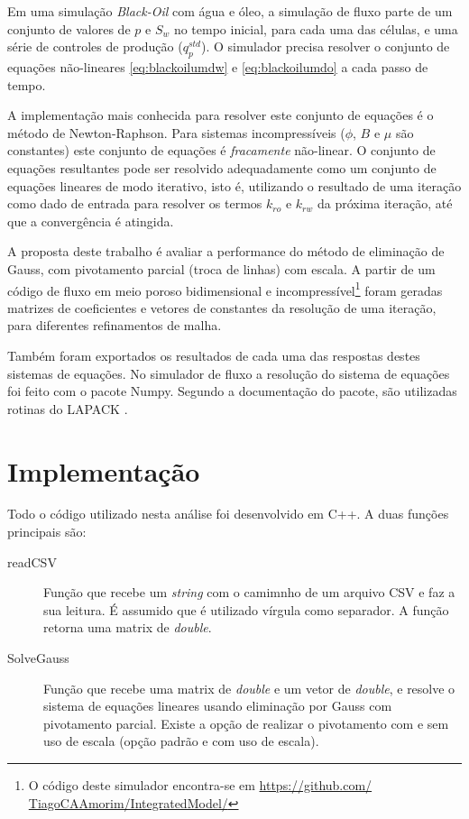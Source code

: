 \documentclass[final,5p]{elsarticle}
\numberwithin{equation}{section}
\begin{document}
            Em uma simulação \emph{Black-Oil} com água e óleo, a simulação de fluxo parte de um conjunto de valores de $p$ e $S_w$ no tempo inicial, para cada uma das células, e uma série de controles de produção ($q^{std}_p$). O simulador precisa resolver o conjunto de equações não-lineares \ref{eq:blackoilumdw} e \ref{eq:blackoilumdo} a cada passo de tempo.

            A implementação mais conhecida para resolver este conjunto de equações é o método de Newton-Raphson. Para sistemas incompressíveis ($\phi$, $B$ e $\mu$ são constantes) este conjunto de equações é \emph{fracamente} não-linear. O conjunto de equações resultantes pode ser resolvido adequadamente como um conjunto de equações lineares de modo iterativo, isto é, utilizando o resultado de uma iteração como dado de entrada para resolver os termos $k_{ro}$ e $k_{rw}$ da próxima iteração, até que a convergência é atingida.

            A proposta deste trabalho é avaliar a performance do método de eliminação de Gauss, com pivotamento parcial (troca de linhas) com escala. A partir de um código de fluxo em meio poroso bidimensional e incompressível\footnote{O código deste simulador encontra-se em \href{https://github.com/TiagoCAAmorim/IntegratedModel/tree/test_matrix}{https://github.com/ TiagoCAAmorim/IntegratedModel/}} foram geradas matrizes de coeficientes e vetores de constantes da resolução de uma iteração, para diferentes refinamentos de malha.

            Também foram exportados os resultados de cada uma das respostas destes sistemas de equações. No simulador de fluxo a resolução do sistema de equações foi feito com o pacote Numpy. Segundo a documentação do pacote, são utilizadas rotinas do LAPACK \cite{dongarra1992lapack}.

\section{Implementação} \label{sec:implementacao}

        Todo o código utilizado nesta análise foi desenvolvido em C++. A duas funções principais são:

        \begin{description}
            \item[readCSV] Função que recebe um \emph{string} com o camimnho de um arquivo CSV e faz a sua leitura. É assumido que é utilizado vírgula como separador. A função retorna uma matrix de \emph{double}.
            \item[SolveGauss] Função que recebe uma matrix de \emph{double} e um vetor de \emph{double}, e resolve o sistema de equações lineares usando eliminação por Gauss com pivotamento parcial. Existe a opção de realizar o pivotamento com e sem uso de escala (opção padrão e com uso de escala).
        \end{description}
\end{document}
